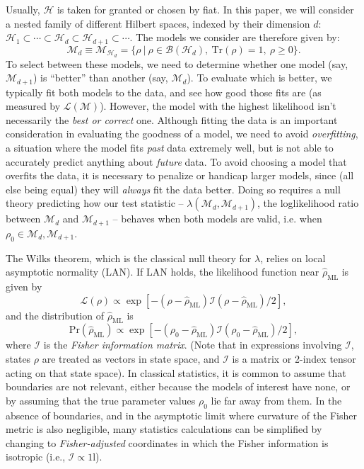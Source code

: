 \documentclass[aps,pra, twocolumn]{revtex4-1}
\newcommand{\M}{\mathcal{M}}
\newcommand{\cH}{\mathcal{H}}
\newcommand{\Id}{\mathbb{I}}
\def\Id{1\!\mathrm{l}}
\newcommand{\rhohat}{\hat{\rho}}
\begin{document}
Usually, $\cH$ is taken for granted or chosen by fiat.  In this paper, we will consider a nested family of different Hilbert spaces, indexed by their dimension $d$: $\cH_{1}  \subset \cdots \subset \cH_{d} \subset \cH_{d+1} \subset \cdots$.  The models we consider are therefore given by:
\begin{equation}
\M_{d} \equiv \mathcal{M}_{\cH_{d}} = \{\rho~|~\rho \in \mathcal{B}(\mathcal{H}_{d}),~\mathrm{Tr}(\rho) =1,~\rho \geq 0\}.
\end{equation}
To select between these models, we need to determine whether one model (say, $\M_{d + 1}$) is ``better'' than another (say, $\M_{d}$).  To evaluate which is better, we typically fit both models to the data, and see how good those fits are (as measured by $\mathcal{L}(\M)$). However, the model with the highest likelihood isn't necessarily the \emph{best or correct} one. Although fitting the data is an important consideration in evaluating the goodness of a model, we need to avoid \emph{overfitting}, a situation where the model fits \emph{past} data extremely well, but is not able to accurately predict anything about \emph{future} data. To avoid choosing a model that overfits the data, it is necessary to penalize or handicap larger models, since (all else being equal) they will \emph{always} fit the data better.  Doing so requires a null theory predicting how our test statistic -- $\lambda(\M_{d}, \M_{d+1})$, the loglikelihood ratio between $\M_d$ and $\M_{d+1}$ -- behaves when both models are valid, i.e. when $\rho_{0} \in \M_{d},\M_{d + 1}$.

The Wilks theorem, which is the classical null theory for $\lambda$, relies on local asymptotic normality (LAN).  If LAN holds, the likelihood function near $\rhohat_{\mathrm{ML}}$ is given by
\begin{equation}
\label{eq:lanl}
\mathcal{L}(\rho) \propto \exp\left[-(\rho - \rhohat_{\mathrm{ML}})\mathcal{I}(\rho - \rhohat_{\mathrm{ML}})/2\right],
\end{equation}
and the distribution of $\rhohat_{\mathrm{ML}}$ is
\begin{equation}
\label{eq:landist}
\mathrm{Pr}(\rhohat_{\mathrm{ML}}) \propto \exp\left[-(\rho_{0} - \rhohat_{\mathrm{ML}})\mathcal{I}(\rho_{0} - \rhohat_{\mathrm{ML}})/2\right],
\end{equation}
where $\mathcal{I}$ is the \emph{Fisher information matrix}.  (Note that in expressions involving $\mathcal{I}$, states $\rho$ are treated as vectors in state space, and $\mathcal{I}$ is a matrix or 2-index tensor acting on that state space).  In classical statistics, it is common to assume that boundaries are not relevant, either because the models of interest have none, or by assuming that the true parameter values $\rho_{0}$ lie far away from them.  In the absence of boundaries, and in the asymptotic limit where curvature of the Fisher metric is also negligible, many statistics calculations can be simplified by changing to \emph{Fisher-adjusted} coordinates in which the Fisher information is isotropic (i.e., $\mathcal{I}\propto\Id$).
\end{document}
